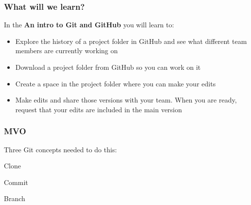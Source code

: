 \documentclass[aspectratio=169]{beamer} %
\begin{document}
\begin{frame}
\begin{columns}[c]
	\end{columns}
\end{frame}




\begin{frame}
\frametitle{What will we learn?}

	In the \textbf{An intro to Git and GitHub} you will learn to:
	
	\begin{itemize}
		\item Explore the history of a project folder in GitHub and see what different team members are currently working on
		\item Download a project folder from GitHub so you can work on it
		\item Create a space in the project folder where you can make your edits
		\item Make edits and share those versions with your team. When you are ready, request that your edits are included in the main version
	\end{itemize}

\end{frame}


\begin{frame}
\frametitle{MVO}

	\hspace*{2.5cm}\Large{Three Git concepts needed to do this:}
	
	\begin{itemize}
		\setlength{\itemindent}{3cm}
		\Large{\item Clone}
		\Large{\item Commit}
		\Large{\item Branch}
	\end{itemize}

\end{frame}
\end{document}
